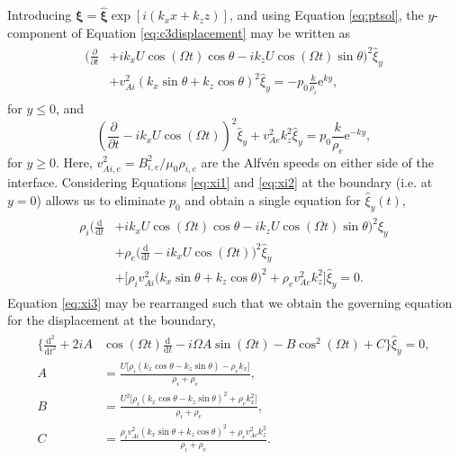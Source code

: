 Introducing $\bm \xi = \hat{\bm \xi} \exp[i (k_x x + k_z z)]$, and using Equation \eqref{eq:ptsol}, the $y$-component of Equation \eqref{eq:c3displacement} may be written as
%
\begin{align}
\begin{split}
\label{eq:xi1}
\bigg( \frac{\partial}{\partial t}
& + i k_x U \cos(\Omega t) \cos\theta
- i k_z U \cos(\Omega t) \sin\theta \bigg)^2 \hat \xi_y
\\
& + v_{A i}^2 \left( k_x \sin\theta
+ k_z \cos\theta \right)^2 \hat \xi_y
= - p_0 \frac{k}{\rho_i} \mathrm{e}^{k y},
\end{split}
\end{align}
%
for $y \leq 0$, and
%
\begin{equation}
\label{eq:xi2}
\left( \frac{\partial}{\partial t}
- i k_x U \cos(\Omega t) \right)^2 \hat \xi_y
+ v_{A e}^2 k_z^2 \hat \xi_y
= p_0 \frac{k}{\rho_e} \mathrm{e}^{- k y},
\end{equation}
%
for $y \geq 0$.
Here, $v_{Ai, e}^2 = B_{i, e}^2 / \mu_0\rho_{i, e}$ are the Alfv\'en speeds on either side of the interface.
Considering Equations \eqref{eq:xi1} and \eqref{eq:xi2} at the boundary (i.e. at $y=0$) allows us to eliminate $p_0$ and obtain a single equation for $\hat \xi_y (t)$,
%
\begin{align}
\begin{split}
\label{eq:xi3}
\rho_i \bigg( \frac{\mathrm{d}}{\mathrm{d} t}
& + i k_x U \cos(\Omega t) \cos\theta
- i k_z U \cos(\Omega t) \sin\theta \bigg)^2 \hat \xi_y
\\
& + \rho_e \bigg( \frac{\mathrm{d}}{\mathrm{d} t}
- i k_x U \cos(\Omega t) \bigg)^2 \hat \xi_y
\\[0.1cm]
& + \big[ \rho_i v_{A i}^2 \big( k_x \sin\theta
+ k_z \cos\theta \big)^2
+ \rho_e v_{A e}^2 k_z^2 \big] \hat \xi_y
= 0.
\end{split}
\end{align}
%
Equation \eqref{eq:xi3} may be rearranged such that we obtain the governing equation for the displacement at the boundary,
%
\begin{align}
\begin{split}
\label{eq:c3goveq}
\bigg\{ \frac{\mathrm{d}^2}{\mathrm{d} t^2}
+ 2 i A & \cos(\Omega t) \frac{\mathrm{d}}{\mathrm{d} t}
- i \Omega A \sin(\Omega t)
- B \cos^2(\Omega t) 
+ C \bigg\} \hat \xi_y
= 0,
\\[0.1cm]
A
& = \frac{U \big[ \rho_i ( k_x \cos\theta - k_z \sin\theta ) 
- \rho_e k_x \big]}{\rho_i + \rho_e},
\\[0.1cm]
B
& = \frac{U^2 \big[ \rho_i \left( k_x \cos\theta
- k_z \sin\theta \right)^2
+ \rho_e k_x^2 \big]}{\rho_i + \rho_e},
\\[0.1cm]
C
& = \frac{\rho_i v_{A i}^2 \left( k_x \sin\theta
+ k_z \cos\theta \right)^2
+ \rho_e v_{A e}^2 k_z^2}{\rho_i + \rho_e}.
\end{split}
\end{align}
